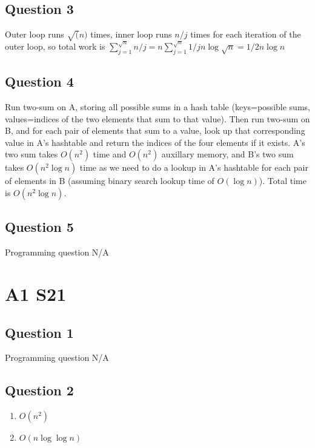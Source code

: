 \documentclass[11pt]{article}
\begin{document}
\subsection{Question 3}

Outer loop runs $\sqrt(n)$ times, inner loop runs $n/j$ times for each iteration of the outer loop, so total work is $\sum_{j=1}^{\sqrt{n}} n/j = n \sum_{j=1}^{\sqrt{n}} 1/j n \log \sqrt{n} = 1/2 n \log n $

\subsection{Question 4}

Run two-sum on A, storing all possible sums in a hash table (keys=possible sums, values=indices of the two elements that sum to that value). Then run two-sum on B, and for each pair of elements that sum to a value, look up that corresponding value in A's hashtable and return the indices of the four elements if it exists. A's two sum takes $O(n^2)$ time and $O(n^2)$ auxillary memory, and B's two sum takes $O(n^2 \log n)$ time as we need to do a lookup in A's hashtable for each pair of elements in B (assuming binary search lookup time of $O(\log n)$). Total time is $O(n^2 \log n)$.

\subsection{Question 5}

Programming question N/A

\section{A1 S21}

\subsection{Question 1}

Programming question N/A

\subsection{Question 2}

\begin{enumerate}
    \item $O(n^2)$
    \item $O(n \log \log n)$
\end{enumerate}
\end{document}

